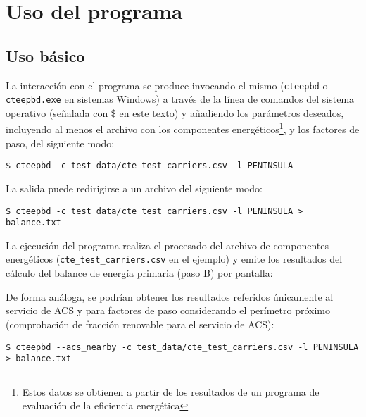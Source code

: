 \documentclass[10pt,notitlepage,oneside,a4paper]{article}
\begin{document}
\clearpage
\newpage
\section{Uso del programa}
\label{sec:usoprograma}

\subsection{Uso básico}

La interacción con el programa se produce invocando el mismo (\texttt{cteepbd} o \texttt{cteepbd.exe} en sistemas Windows) a través de la línea de comandos del sistema operativo (señalada con \$ en este texto) y añadiendo los parámetros deseados, incluyendo al menos el archivo con los componentes energéticos\footnote{Estos datos se obtienen a partir de los resultados de un programa de evaluación de la eficiencia energética}, y los factores de paso, del siguiente modo:

\begin{Verbatim}[fontsize=\small]
	$ cteepbd -c test_data/cte_test_carriers.csv -l PENINSULA
\end{Verbatim}

La salida puede redirigirse a un archivo del siguiente modo:

\begin{Verbatim}[fontsize=\small]
	$ cteepbd -c test_data/cte_test_carriers.csv -l PENINSULA > balance.txt
\end{Verbatim}

La ejecución del programa realiza el procesado del archivo de componentes energéticos
(\texttt{cte\_test\_carriers.csv} en el ejemplo) y emite los resultados  del cálculo del balance de energía primaria (paso B) por pantalla:


De forma análoga, se podrían obtener los resultados referidos únicamente al servicio de ACS y para factores de paso considerando el perímetro próximo (comprobación de fracción renovable para el servicio de ACS):

\begin{Verbatim}[fontsize=\small]
	$ cteepbd --acs_nearby -c test_data/cte_test_carriers.csv -l PENINSULA > balance.txt
\end{Verbatim}

\end{document}

